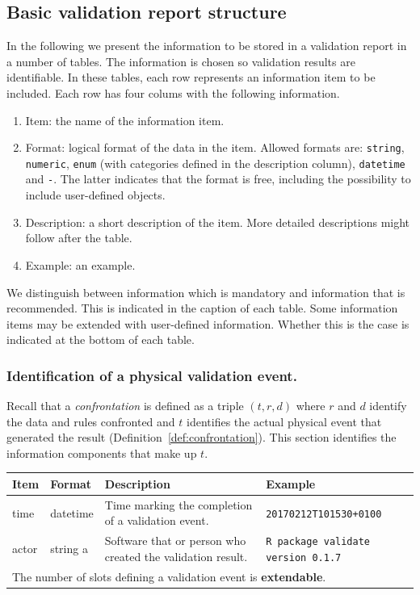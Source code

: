 \documentclass[a4paper, 11pt,titlepage]{article}
\newcommand{\code}[1]{\texttt{#1}}
\begin{document}
\subsection{Basic validation report structure}
\label{sect:basicreportstructure}
In the following we present the information to be stored in a validation report
in a number of tables. The information is chosen so validation results are
identifiable. In these tables, each row represents an information item to be
included. Each row has four colums with the following information.
%
\begin{enumerate}
\item Item: the name of the information item.
\item Format: logical format of the data in the item. Allowed formats are: \code{string},
\code{numeric}, \code{enum} (with categories defined in the description
column), \code{datetime} and \code{-}. The latter indicates that the format is
free, including the possibility to include user-defined objects.
\item Description: a short description of the item. More detailed descriptions
might follow after the table.
\item Example: an example.
\end{enumerate}
%
We distinguish between information which is mandatory and information that
is recommended. This is indicated in the caption of each table. Some
information items may be extended with user-defined information. Whether
this is the case is indicated at the bottom of each table.


\subsubsection{Identification of a physical validation event.}
\label{sect:idevent}
Recall that a \emph{confrontation} is defined as a triple $(t,r,d)$ where $r$
and $d$ identify the data and rules confronted and $t$ identifies the actual
physical event that generated the result
(Definition~\ref{def:confrontation}).  This section identifies the
information components that make up $t$.
%
\begin{center}
\label{tab:idve}
\begin{tabular}{|lp{15mm}p{}p{}|}
\hline
\textbf{Item} & \textbf{Format} & \textbf{Description} &\textbf{Example}\\
\hline
time          & datetime & Time marking the completion of a validation event. & \code{20170212T101530+0100}\\
actor         & string        a  & Software that or person who created the validation result. & \code{R package validate version 0.1.7}\\
\hline
\multicolumn{4}{|l|}{The number of slots defining a validation event is \textbf{extendable}.
}\\
\hline
\end{tabular}
\end{center}
\end{document}
